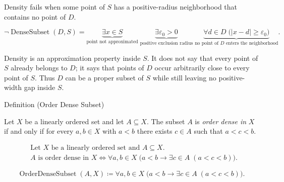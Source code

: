 \begin{remark*}
Density fails when some point of $S$ has a positive-radius neighborhood that contains no point of $D$.
\end{remark*}

\begin{remark*}
\[
\neg\operatorname{DenseSubset}(D,S)
=
\underbrace{\exists x\in S}_{\text{point not approximated}}
\;\underbrace{\exists \varepsilon_0>0}_{\text{positive exclusion radius}}
\;\underbrace{\forall d\in D\;\bigl(|x-d|\ge \varepsilon_0\bigr)}_{\text{no point of }D\text{ enters the neighborhood}}.
\]
\end{remark*}

\begin{remark*}[Interpretation]
Density is an approximation property inside $S$. It does not say that every point of $S$ already belongs to $D$; it says that points of $D$ occur arbitrarily close to every point of $S$. Thus $D$ can be a proper subset of $S$ while still leaving no positive-width gap inside $S$.
\end{remark*}

\NoLocalDependencies

\begin{definitionbox}{Definition (Order Dense Subset)}
\begin{definition}
\label{def:order-dense-subset}
Let $X$ be a linearly ordered set and let $A\subseteq X$. The subset $A$ is \emph{order dense in} $X$ if and only if for every $a,b\in X$ with $a<b$ there exists $c\in A$ such that $a<c<b$.
\end{definition}
\end{definitionbox}

\begin{remark*}
\[
\begin{aligned}
&\text{Let }X\text{ be a linearly ordered set and }A\subseteq X.\\
&A\text{ is order dense in }X
\Longleftrightarrow
\forall a,b\in X\;\bigl(a<b\rightarrow \exists c\in A\;(a<c<b)\bigr).
\end{aligned}
\]
\end{remark*}

\begin{remark*}
\[
\operatorname{OrderDenseSubset}(A,X)\coloneqq
\forall a,b\in X\;\bigl(a<b\rightarrow \exists c\in A\;(a<c<b)\bigr).
\]
\end{remark*}

